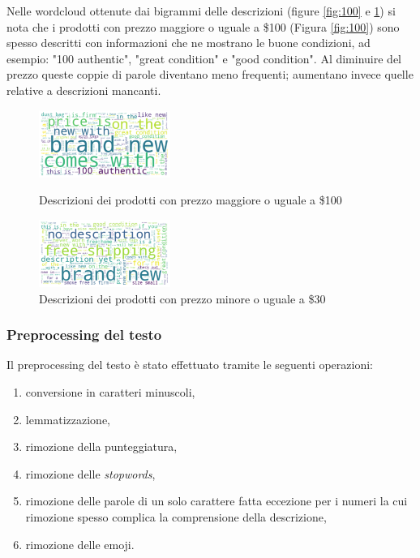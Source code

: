 \begin{itemize}
Nelle wordcloud ottenute dai bigrammi delle descrizioni (figure
\ref{fig:100} e \ref{Fig:minore_30}) si nota
che i prodotti con prezzo maggiore o uguale a \$100 (Figura \ref{fig:100}) sono
spesso descritti con informazioni che ne mostrano le buone condizioni, ad
esempio: "100 authentic", "great condition" e "good condition". Al diminuire del
prezzo queste coppie di parole diventano meno frequenti; aumentano invece quelle
relative a descrizioni mancanti.

\end{itemize}

\begin{figure}[H]
  \begin{minipage}{0.48\textwidth}
    \centering
    \includegraphics[height=2.2cm, keepaspectratio]{maggiore_100}
    \caption{Descrizioni dei prodotti con prezzo maggiore o uguale a \$100}
    \label{fig:100}
  \end{minipage}\hfill
  \begin{minipage}{0.48\textwidth}
    \centering
    \includegraphics[height=2.2cm, keepaspectratio]{minore_30}
    \caption{Descrizioni dei prodotti con prezzo minore o uguale a \$30}
    \label{Fig:minore_30}
  \end{minipage}
\end{figure}


\subsubsection{Preprocessing del testo}

Il preprocessing del testo è stato effettuato tramite le seguenti operazioni:
\begin{enumerate}
  \item conversione in caratteri minuscoli,
  \item lemmatizzazione,
  \item rimozione della punteggiatura,
  \item rimozione delle \textit{stopwords},
  \item rimozione delle parole di un solo carattere fatta eccezione per i
        numeri la cui rimozione spesso complica la comprensione della descrizione,
  \item rimozione delle emoji.
\end{enumerate}

